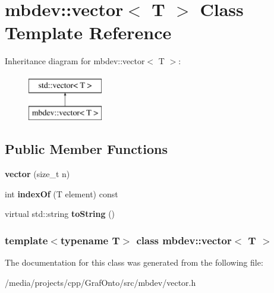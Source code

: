 \hypertarget{classmbdev_1_1vector}{\section{mbdev\-:\-:vector$<$ \-T $>$ \-Class \-Template \-Reference}
\label{classmbdev_1_1vector}
}
\-Inheritance diagram for mbdev\-:\-:vector$<$ \-T $>$\-:\begin{figure}[H]
\begin{center}
\leavevmode
\includegraphics[height=2.000000cm]{classmbdev_1_1vector}
\end{center}
\end{figure}
\subsection*{\-Public \-Member \-Functions}
\begin{DoxyCompactItemize}
\item 
\hypertarget{classmbdev_1_1vector_a9a37ea62d9ba3d2b4a2e4928c1af82f5}{{\bfseries vector} (size\-\_\-t n)}\label{classmbdev_1_1vector_a9a37ea62d9ba3d2b4a2e4928c1af82f5}

\item 
\hypertarget{classmbdev_1_1vector_a99c3219ba4f717d34cd459636592b28b}{int {\bfseries index\-Of} (\-T element) const }\label{classmbdev_1_1vector_a99c3219ba4f717d34cd459636592b28b}

\item 
\hypertarget{classmbdev_1_1vector_a23075da46c91e0e298a5d00ad75e1a37}{virtual std\-::string {\bfseries to\-String} ()}\label{classmbdev_1_1vector_a23075da46c91e0e298a5d00ad75e1a37}

\end{DoxyCompactItemize}
\subsubsection*{template$<$typename \-T$>$ class mbdev\-::vector$<$ T $>$}



\-The documentation for this class was generated from the following file\-:\begin{DoxyCompactItemize}
\item 
/media/projects/cpp/\-Graf\-Onto/src/mbdev/vector.\-h\end{DoxyCompactItemize}
